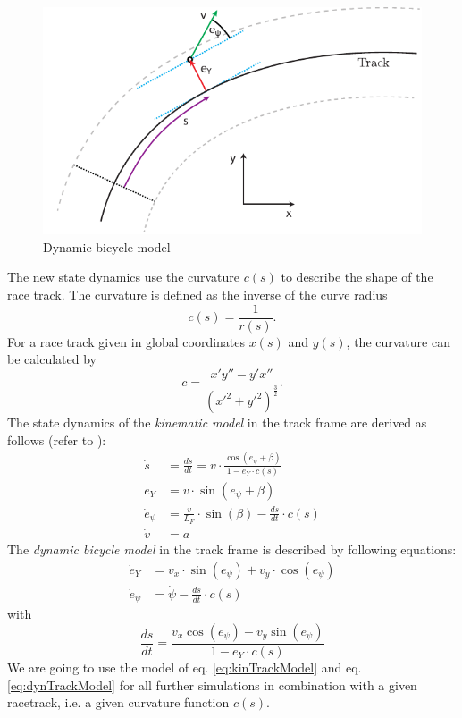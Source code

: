 \begin{figure}[ht]
	\centering
  	\includegraphics{../../Figures/Models/s_ey.pdf}
	\caption{Dynamic bicycle model}
	\label{fig:s_ey}
\end{figure}
The new state dynamics use the curvature $c(s)$ to describe the shape of the race track. The curvature is defined as the inverse of the curve radius
\begin{equation}
c(s) = \frac{1}{r(s)}.
\end{equation}
For a race track given in global coordinates $x(s)$ and $y(s)$, the curvature can be calculated by
\begin{equation}
c = \frac{x'y''-y'x''}{(x'^2+y'^2)^\frac{3}{2}}.
\end{equation}
The state dynamics of the \emph{kinematic model} in the track frame are derived as follows (refer to \cite{rajamani2005vehicle}):
\begin{subequations}\label{eq:kinTrackModel}
\begin{align}
    \dot s &= \frac{ds}{dt}= v\cdot \frac{\cos(e_\psi+\beta)}{1-e_Y\cdot c(s)}\\
    \dot e_Y &= v \cdot \sin(e_\psi+\beta)\\
    \dot e_\psi &= \frac{v}{L_F}\cdot \sin(\beta)-\frac{ds}{dt}\cdot c(s)\\
    \dot v &= a
\end{align}
\end{subequations}
The \emph{dynamic bicycle model} in the track frame is described by following equations:
\begin{subequations}\label{eq:dynTrackModel}
\begin{align}
    \dot e_Y &= v_x\cdot \sin(e_\psi) + v_y\cdot \cos(e_\psi)\\
    \dot e_\psi &= \dot\psi - \frac{ds}{dt}\cdot c(s)
\end{align}
\end{subequations}
with
\begin{equation}
\frac{ds}{dt} = \frac{v_x\cos(e_\psi)-v_y\sin(e_\psi)}{1-e_Y\cdot c(s)}
\end{equation}
We are going to use the model of eq. \ref{eq:kinTrackModel} and eq. \ref{eq:dynTrackModel} for all further simulations in combination with a given racetrack, i.e. a given curvature function $c(s)$.
